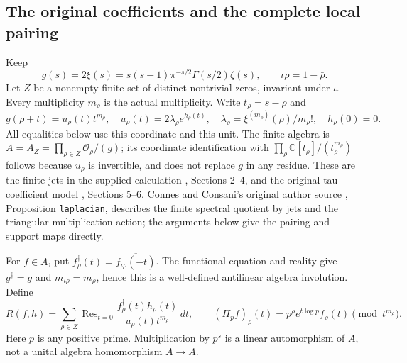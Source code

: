 \documentclass[11pt,a4paper]{article}
\theoremstyle{definition}\newtheorem{definition}[theorem]{Definition}
\newcommand{\C}{\mathbb C}\newcommand{\R}{\mathbb R}
\providecommand{\Res}{\operatorname{Res}}
\begin{document}
\subsection{The original coefficients and the complete local pairing}
Keep
\[
 g(s)=2\xi(s)=s(s-1)\pi^{-s/2}\Gamma(s/2)\zeta(s),\qquad
 \iota\rho=1-\bar\rho.
 \tag{FJ1}\label{fj:fj:objects}
\]
Let $Z$ be a nonempty finite set of distinct nontrivial zeros, invariant
under $\iota$. Every multiplicity $m_\rho$ is the actual multiplicity.
Write $t_\rho=s-\rho$ and
\[
 g(\rho+t)=u_\rho(t)t^{m_\rho},\quad
 u_\rho(t)=2\lambda_\rho e^{h_\rho(t)},\quad
 \lambda_\rho=\xi^{(m_\rho)}(\rho)/m_\rho!,\quad h_\rho(0)=0.
 \tag{FJ2}
\]
All equalities below use this coordinate and this unit. The finite algebra is
$A=A_Z=\prod_{\rho\in Z}\mathcal O_\rho/(g)$; its coordinate identification
with $\prod_\rho\C[t_\rho]/(t_\rho^{m_\rho})$ follows because $u_\rho$
is invertible, and does not replace $g$ in any residue.
These are the finite jets in the supplied calculation \cite{FJprime},
Sections 2--4, and the original tau coefficient model \cite{FJtau},
Sections 5--6. Connes and Consani's original author source
\cite{ConnesConsaniHochschild}, Proposition \texttt{laplacian}, describes the finite
spectral quotient by jets and the triangular multiplication action;
the arguments below give the pairing and support maps directly.

For $f\in A$, put
$f^\dagger_\rho(t)=\overline{f_{\iota\rho}(-\bar t)}$.
The functional equation and reality give $g^\dagger=g$ and
$m_{\iota\rho}=m_\rho$, hence this is a well-defined antilinear algebra
involution. Define
\[
 R(f,h)=\sum_{\rho\in Z}\Res_{t=0}
       \frac{f^\dagger_\rho(t)h_\rho(t)}{u_\rho(t)t^{m_\rho}}\,dt,
 \qquad (\Pi_p f)_\rho(t)=p^\rho e^{t\log p}f_\rho(t)\pmod {t^{m_\rho}}.
 \tag{FJ3}\label{fj:fj:raw}
\]
Here $p$ is any positive prime. Multiplication by $p^s$ is a linear
automorphism of $A$, not a unital algebra homomorphism $A\to A$.
\end{document}
